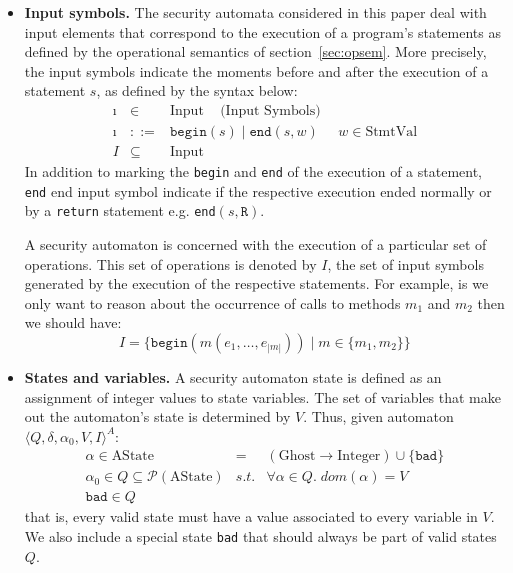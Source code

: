 \documentclass[10pt,notitlepage,twoside]{article}
\newcommand{\automata}[5]{\langle #1,#2,#3,#4,#5 \rangle^A}
\newcommand{\qu}{\alpha}
\newcommand{\theautomaton}{\automata{Q}{\delta}{\qu_0}{V}{I}}
\newcommand{\retval}[1]{\texttt{R}}
\begin{document}
\begin{itemize}
\item \textbf{Input symbols.} The security automata considered in this paper deal with  input elements that  correspond to the execution of a program's statements as defined by the operational semantics of section~\ref{sec:opsem}.
More precisely, the input symbols indicate the moments before and after the execution of a statement $s$, as defined by the syntax below:
\begin{displaymath}
\begin{array}{rcl}
\imath  & \in & \textrm{Input}\;\;\; \mbox{  (Input Symbols)} \\
\imath & ::= & \texttt{begin}(s) \mid \texttt{end}(s,w) \;\;\;\;\;w \in \textrm{StmtVal} \\
I & \subseteq & \textrm{Input} 
\end{array}
\end{displaymath}
In addition to marking the \texttt{begin} and \texttt{end} of the execution of a statement, \texttt{end} end input symbol indicate if the respective execution ended normally or by a \texttt{return} statement e.g. \texttt{end}$(s,\retval{})$.

A security automaton is concerned with the execution of a particular set of operations. This set of operations is denoted by  $I$, the set of input symbols generated by the execution of the respective statements.
For example, is we only want to reason about the occurrence of calls to methods  $m_1$ and $m_2$ then we should have:
\begin{displaymath}
I = \{ \texttt{begin}(m(e_1,\ldots,e_{|m|})) \mid m \in \{m_1,m_2\} \}
\end{displaymath}

\item \textbf{States and variables.} A security automaton state is defined as an assignment of integer values to state variables. The set of variables that make out the automaton's state is determined by $V$. Thus, given automaton $\theautomaton$:
\begin{displaymath}
\begin{array}{rcl}
\qu \in \textrm{AState} & = & (\textrm{Ghost} \rightarrow \textrm{Integer}) \cup \{ \texttt{bad} \}  \\
\qu_0 \in Q  \subseteq  \mathcal{P}(\textrm{AState}) & s.t. & \forall \qu \in Q.\; dom(\qu) = V  \\
\texttt{bad} \in Q & & 
\end{array}
\end{displaymath}
that is, every valid state must have a value associated to every variable in $V$. We also include a special state \texttt{bad} that should always be part of valid states $Q$. 


\end{itemize}
\end{document}
